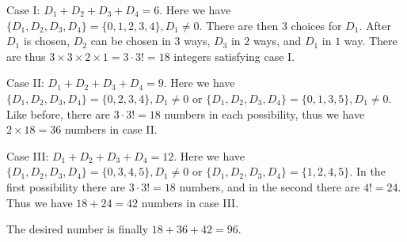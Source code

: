 \documentclass[11pt, openany]{book}
\theoremstyle{change} \theoremheaderfont{\blue\sffamily\bfseries}
\theoremstyle{nonumberplain} \theoremheaderfont{\sffamily\bfseries}
\newcommand{\í}{\'{\i}}
\begin{document}
\bigskip

Case I: $D_1 + D_2 + D_3 + D_4 = 6$. Here we have  $\{D_1, D_2, D_3,
D_4\} = \{0, 1, 2, 3, 4\}, D_1 \neq 0$. There are then $3$ choices
for $D_1$. After $D_1$ is chosen, $D_2$ can be chosen in $3$ ways,
$D_3$ in $2$ ways, and $D_1$ in $1$ way. There are thus $3\times 3
\times 2 \times 1 = 3\cdot 3! = 18$ integers satisfying case I.

\bigskip

Case II: $D_1 + D_2 + D_3 + D_4 = 9$. Here we have $\{D_1, D_2, D_3,
D_4\} = \{0, 2, 3, 4\}, D_1 \neq 0$ or $\{D_1, D_2, D_3, D_4\} =
\{0, 1, 3, 5\}, D_1 \neq 0$. Like before, there are $ 3\cdot 3! =
18$ numbers in each possibility, thus we have $2\times 18 = 36$
numbers in case II.

\bigskip

Case III: $D_1 + D_2 + D_3 + D_4 = 12$. Here we have $\{D_1, D_2,
D_3, D_4\} = \{0, 3,4,5\}, D_1 \neq 0$ or $\{D_1, D_2, D_3, D_4\} =
\{1, 2, 4, 5\}$. In the first possibility there are $ 3\cdot 3! =
18$ numbers, and in the second there are $4! = 24$. Thus we have $18
+ 24 = 42$ numbers in case III.

\bigskip
The desired number is finally $18 + 36 + 42 = 96.$
\end{document}
